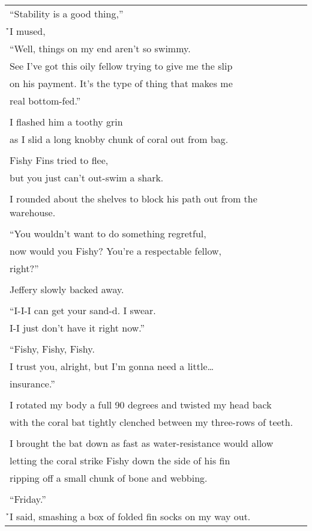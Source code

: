 \documentclass{article}
\begin{document}
\begin{center}
\begin{tabular}{l}
``Stability is a good thing,'' \\
\h\h{}I mused, \\
``Well, things on my end aren't so swimmy. \\
See I've got this oily fellow trying to give me the slip \\
on his payment.  It's the type of thing that makes me \\
real bottom-fed.'' \\
\\
I flashed him a toothy grin \\
as I slid a long knobby chunk of coral out from bag. \\
\\
Fishy Fins tried to flee, \\
but you just can't out-swim a shark. \\
\\
I rounded about the shelves to block his path out from the warehouse. \\
\\
``You wouldn't want to do something regretful, \\
now would you Fishy? You're a respectable fellow, \\
right?'' \\
\\
Jeffery slowly backed away. \\
\\
``I-I-I can get your sand-d. I swear. \\
I-I just don't have it right now.'' \\
\\
``Fishy, Fishy, Fishy. \\
I trust you, alright, but I'm gonna need a little\ldots{} \\
insurance.'' \\
\\
I rotated my body a full 90 degrees and twisted my head back \\
with the coral bat tightly clenched between my three-rows of teeth. \\
\\
I brought the bat down as fast as water-resistance would allow \\
letting the coral strike Fishy down the side of his fin \\
ripping off a small chunk of bone and webbing. \\
\\
``Friday.'' \\
\h\h{}I said, smashing a box of folded fin socks on my way out. \\

\end{tabular}
\end{center}
\end{document}
